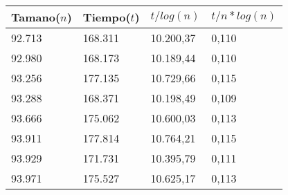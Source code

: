 \begin{table}[H]
\parbox{0.3\textwidth}{
  \begin{tabular}{| l | l | l |l |}
    \hline
    Tamano($n$) & Tiempo($t$) & $t / log(n)$ & $t / n*log(n)$ \\ \hline
92.713	&	168.311	&	10.200,37	&	0,110	\\ \hline
92.980	&	168.173	&	10.189,44	&	0,110	\\ \hline

93.256	&	177.135	&	10.729,66	&	0,115	\\ \hline
93.288	&	168.371	&	10.198,49	&	0,109	\\ \hline
93.666	&	175.062	&	10.600,03	&	0,113	\\ \hline
93.911	&	177.814	&	10.764,21	&	0,115	\\ \hline
93.929	&	171.731	&	10.395,79	&	0,111	\\ \hline
93.971	&	175.527	&	10.625,17	&	0,113	\\ \hline


\end{tabular}}
\end{table}
